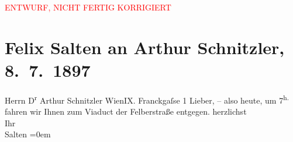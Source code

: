 
\begin{center}
            \textcolor{red}{ENTWURF, NICHT FERTIG KORRIGIERT}
                      \end{center}
            
         \renewcommand{\erwaehnteOrte}{Orte: Felberstraße, Frankgasse, IX., Alsergrund, Penzinger Viadukt, Wien}
         \renewcommand{\erwaehnteWerke}{}
               \section[Felix Salten an Arthur Schnitzler, 8. 7. 1897]{ Felix Salten an Arthur Schnitzler, 8. 7. 1897}\nopagebreak{}\rehead{ }\begin{ledgroupsized}[t]{13cm}\normalsize\beginnumbering \toendnotes[C]{\smallbreak\pagebreak[2]} 
\pstart{}{\pb}Herrn D\textsuperscript{r} Arthur Schnitzler \pend{}\pstart{}Wien\pend{}\pstart{}IX. Franckgaſse 1\pend{}{\bigskip}\pstart
           \noindent{}{\pb}Lieber, – also
               heute, um 7\textsuperscript{h.} fahren wir Ihnen zum Viaduct der Felberstraße
               entgegen. \pend
           \pstart
           herzlichst{\\[\baselineskip]}Ihr{\\[\baselineskip]}\spacefill\mbox{Salten}\pend
           \leftskip=0em{}
         
         \endnumbering{}\end{ledgroupsized}\begin{anhang}\end{anhang}\newcommand{\dateiname}{L02761}\newcommand{\titel}{Felix Salten an Arthur Schnitzler, 8. 7. 1897}\newcommand{\editorInnen}{Martin Anton Müller und Laura Untner}
      